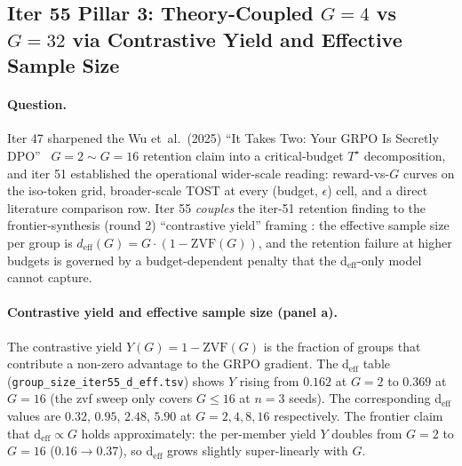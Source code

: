 \subsection{Iter 55 Pillar 3: Theory-Coupled $G{=}4$ vs $G{=}32$ via Contrastive Yield and Effective Sample Size}
\label{sec:group-size-iter55}

\paragraph{Question.}
Iter 47 sharpened the Wu et~al.\ (2025) ``It Takes Two: Your GRPO Is
Secretly DPO''~\citep{wu2025grpo_dpo} $G{=}2 \sim G{=}16$ retention
claim into a critical-budget $T^\star$ decomposition, and iter 51
established the operational wider-scale reading: reward-vs-$G$ curves
on the iso-token grid, broader-scale TOST at every
(budget, $\epsilon$) cell, and a direct literature comparison row.
Iter 55 \emph{couples} the iter-51 retention finding to the
frontier-synthesis (round 2) ``contrastive yield'' framing
\citep{frontier2026}: the
effective sample size per group is $d_{\mathrm{eff}}(G) = G
\cdot (1 - \mathrm{ZVF}(G))$, and the retention failure at higher
budgets is governed by a budget-dependent penalty that the
d$_{\mathrm{eff}}$-only model cannot capture.

\paragraph{Contrastive yield and effective sample size (panel a).}
The contrastive yield $Y(G) = 1 - \mathrm{ZVF}(G)$ is the fraction of
groups that contribute a non-zero advantage to the GRPO gradient.
The d$_{\mathrm{eff}}$ table (\texttt{group\_size\_iter55\_d\_eff.tsv})
shows $Y$ rising from $0.162$ at $G{=}2$ to $0.369$ at $G{=}16$ (the
zvf sweep only covers $G \le 16$ at $n{=}3$ seeds).  The
corresponding d$_{\mathrm{eff}}$ values are $0.32$, $0.95$, $2.48$,
$5.90$ at $G = 2, 4, 8, 16$ respectively.  The frontier claim that
d$_{\mathrm{eff}} \propto G$ holds approximately: the per-member
yield $Y$ doubles from $G{=}2$ to $G{=}16$ (0.16$\to$0.37), so
d$_{\mathrm{eff}}$ grows slightly super-linearly with $G$.

